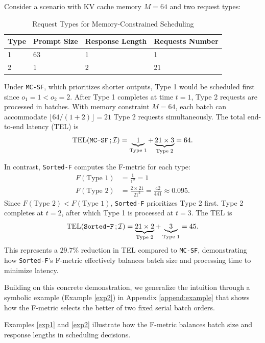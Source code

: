 \documentclass[nonblindrev]{informs3_hide}
\newcommand{\mcsdf}{\texttt{MC-SF}}
\newcommand{\sortF}{\texttt{Sorted-F}}
\begin{document}
\begin{example} \label{exp1}
Consider a scenario with KV cache memory $M = 64$ and two request types:
\renewcommand{\arraystretch}{1.2}
\begin{table}[htbp]
\centering
\caption{Request Types for Memory-Constrained Scheduling}
\label{tab:hetero_example}
\begin{tabular}{|l|l|l|l|}
\hline
\textbf{Type} & \textbf{Prompt Size} & \textbf{Response Length} & \textbf{Requests Number} \\ \hline
1 & 63 & 1 & 1 \\ \hline
2 & 1 & 2 & 21 \\ \hline
\end{tabular}
\end{table}

Under \mcsdf{}, which prioritizes shorter outputs, Type 1 would be scheduled first since $o_1 = 1 < o_2 = 2$. After Type 1 completes at time $t=1$, Type 2 requests are processed in batches. With memory constraint $M=64$, each batch can accommodate $\lfloor 64/(1+2) \rfloor = 21$ Type 2 requests simultaneously. The total end-to-end latency (TEL) is
$$
\text{TEL}(\text{\mcsdf}\,;\mathcal{I}) = \underbrace{1}_{\text{Type 1}} + \underbrace{21 \times 3}_{\text{Type 2}} = 64.
$$

In contrast, \sortF{} computes the F-metric for each type:
\begin{align*}
F(\text{Type 1}) &= \frac{1}{1^2} = 1 \\
F(\text{Type 2}) &= \frac{2 \times 21}{21^2} = \frac{42}{441} \approx 0.095.
\end{align*}
Since $F(\text{Type 2}) < F(\text{Type 1})$, \sortF{} prioritizes Type 2 first. Type 2 completes at $t=2$, after which Type 1 is processed at $t=3$. The TEL is
$$
\text{TEL}(\text{\sortF}\,;\mathcal{I})= \underbrace{21 \times 2}_{\text{Type 2}} + \underbrace{3}_{\text{Type 1}} = 45.
$$
This represents a $29.7\%$ reduction in TEL compared to \mcsdf, demonstrating how \sortF{}'s F-metric effectively balances batch size and processing time to minimize latency.
\end{example}

Building on this concrete demonstration, we generalize the intuition through a symbolic example (Example \ref{exp2}) in Appendix \ref{append:example} that shows how the F-metric selects the better of two fixed serial batch orders.

Examples \ref{exp1} and \ref{exp2} illustrate how the F-metric balances batch size and response lengths in scheduling decisions.
\end{document}
